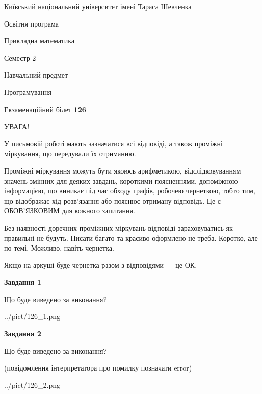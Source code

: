 \documentclass[12pt, ukrainian]{article}
\begin{document}
{{\begin {small}\par
{ \center  Київський національний університет імені Тараса Шевченка \par}
{\parbox {5 cm}{Освітня програма \hfill}{\parbox {7 cm}{Прикладна математика\hfill}}\parbox {6 cm}{\hfill Семестр 2}}\par
{\parbox {5 cm} {Навчальний предмет \hfill}\parbox {7 cm}{Програмування \hfill}\parbox {6cm}{\hfill}\par}\vspace{-7pt} \end{small}}{\center Екзаменаційний білет \No \textbf
{ 126 }\par}}
{
\begin {large}
УВАГА!

У письмовій роботі мають зазначатися всі відповіді, а також проміжні міркування, що передували їх отриманню.

Проміжні міркування можуть бути якоюсь арифметикою, відслідковуванням зна\-чень змінних для деяких завдань,
короткими поясненнями, допоміжною інформацією, що виникає під час обходу графів, робочею чернеткою,
тобто тим, що відображає хід розв’язання або пояснює отриману відповідь.
Це є ОБОВ’ЯЗКОВИМ для кожного запитання.

Без наявності доречних проміжних міркувань відповіді зараховуватись як правиль\-ні не будуть.
Писати багато та красиво оформлено не треба. Коротко, але по темі. Можли\-во, навіть чернетка.

Якщо на аркуші буде чернетка разом з відповідями --- це ОК.

\newpage

{\begin {center}\textbf{Завдання 1}\end {center}}\par
Що буде виведено за виконання?\par
\begin{center}
	{../pict/126_1.png}
\end{center}
\newpage

{\begin {center}\textbf{Завдання 2}\end {center}}\par
Що буде виведено за виконання?\par
 (повідомлення інтерпретатора про помилку позначати error)\par
\begin{center}
	{../pict/126_2.png}
\end{center}
\newpage


\end{large}}
\end{document}
